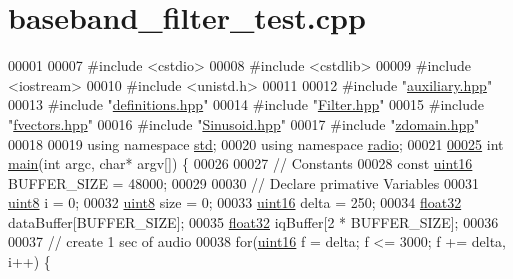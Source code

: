 \hypertarget{baseband__filter__test_8cpp_source}{\section{baseband\+\_\+filter\+\_\+test.\+cpp}
\label{baseband__filter__test_8cpp_source}
}

\begin{DoxyCode}
00001 
00007 \textcolor{preprocessor}{#include <cstdio>}
00008 \textcolor{preprocessor}{#include <cstdlib>}
00009 \textcolor{preprocessor}{#include <iostream>}
00010 \textcolor{preprocessor}{#include <unistd.h>}
00011 
00012 \textcolor{preprocessor}{#include "\hyperlink{auxiliary_8hpp}{auxiliary.hpp}"}
00013 \textcolor{preprocessor}{#include "\hyperlink{definitions_8hpp}{definitions.hpp}"}
00014 \textcolor{preprocessor}{#include "\hyperlink{Filter_8hpp}{Filter.hpp}"}
00015 \textcolor{preprocessor}{#include "\hyperlink{fvectors_8hpp}{fvectors.hpp}"}
00016 \textcolor{preprocessor}{#include "\hyperlink{Sinusoid_8hpp}{Sinusoid.hpp}"}
00017 \textcolor{preprocessor}{#include "\hyperlink{zdomain_8hpp}{zdomain.hpp}"}
00018 
00019 \textcolor{keyword}{using namespace }\hyperlink{namespacestd}{std};
00020 \textcolor{keyword}{using namespace }\hyperlink{namespaceradio}{radio};
00021 
\hypertarget{baseband__filter__test_8cpp_source_l00025}{}\hyperlink{baseband__filter__test_8cpp_a0ddf1224851353fc92bfbff6f499fa97}{00025} \textcolor{keywordtype}{int} \hyperlink{baseband__filter__test_8cpp_a0ddf1224851353fc92bfbff6f499fa97}{main}(\textcolor{keywordtype}{int} argc, \textcolor{keywordtype}{char}* argv[]) \{
00026 
00027     \textcolor{comment}{// Constants}
00028     \textcolor{keyword}{const} \hyperlink{definitions_8hpp_a05f6b0ae8f6a6e135b0e290c25fe0e4e}{uint16} BUFFER\_SIZE = 48000;
00029 
00030     \textcolor{comment}{// Declare primative Variables}
00031     \hyperlink{definitions_8hpp_adde6aaee8457bee49c2a92621fe22b79}{uint8} i = 0;
00032     \hyperlink{definitions_8hpp_adde6aaee8457bee49c2a92621fe22b79}{uint8} size = 0;
00033     \hyperlink{definitions_8hpp_a05f6b0ae8f6a6e135b0e290c25fe0e4e}{uint16} delta = 250;
00034     \hyperlink{definitions_8hpp_aacdc525d6f7bddb3ae95d5c311bd06a1}{float32} dataBuffer[BUFFER\_SIZE];
00035     \hyperlink{definitions_8hpp_aacdc525d6f7bddb3ae95d5c311bd06a1}{float32} iqBuffer[2 * BUFFER\_SIZE];
00036 
00037     \textcolor{comment}{// create 1 sec of audio}
00038     \textcolor{keywordflow}{for}(\hyperlink{definitions_8hpp_a05f6b0ae8f6a6e135b0e290c25fe0e4e}{uint16} f = delta; f <= 3000; f += delta, i++) \{

\end{DoxyCode}
